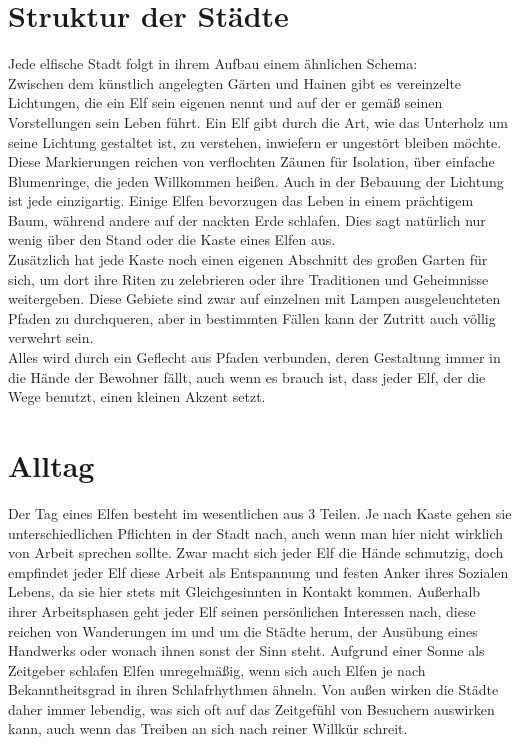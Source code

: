 \documentclass[a4paper,12pt,oneside]{book}
\begin{document}
\chapter{Struktur der Städte}
Jede elfische Stadt folgt in ihrem Aufbau einem ähnlichen Schema: 
\\Zwischen dem künstlich angelegten Gärten und Hainen gibt es vereinzelte Lichtungen, die ein Elf sein eigenen nennt und auf der er gemäß seinen Vorstellungen sein Leben führt. Ein Elf gibt durch die Art, wie das Unterholz um seine Lichtung gestaltet ist, zu verstehen, inwiefern er ungestört bleiben möchte. Diese Markierungen reichen von verflochten Zäunen für Isolation, über einfache Blumenringe, die jeden Willkommen heißen. Auch in der Bebauung der Lichtung ist jede einzigartig. Einige Elfen bevorzugen das Leben in einem prächtigem Baum, während andere auf der nackten Erde schlafen. Dies sagt natürlich nur wenig über den Stand oder die Kaste eines Elfen aus.
\\Zusätzlich hat jede Kaste noch einen eigenen Abschnitt des großen Garten für sich, um dort ihre Riten zu zelebrieren oder ihre Traditionen und Geheimnisse weitergeben. Diese Gebiete sind zwar auf einzelnen mit Lampen ausgeleuchteten Pfaden zu durchqueren, aber in bestimmten Fällen kann der Zutritt auch völlig verwehrt sein.
\\Alles wird durch ein Geflecht aus Pfaden verbunden, deren Gestaltung immer in die Hände der Bewohner fällt, auch wenn es brauch ist, dass jeder Elf, der die Wege benutzt, einen kleinen Akzent setzt.
\chapter{Alltag}
Der Tag eines Elfen besteht im wesentlichen aus 3 Teilen. Je nach Kaste gehen sie unterschiedlichen Pflichten in der Stadt nach, auch wenn man hier nicht wirklich von Arbeit sprechen sollte. Zwar macht sich jeder Elf die Hände schmutzig, doch empfindet jeder Elf diese Arbeit als Entspannung und festen Anker ihres Sozialen Lebens, da sie hier stets mit Gleichgesinnten in Kontakt kommen. Außerhalb ihrer Arbeitsphasen geht jeder Elf seinen persönlichen Interessen nach, diese reichen von Wanderungen im und um die Städte herum, der Ausübung eines Handwerks oder wonach ihnen sonst der Sinn steht. Aufgrund einer Sonne als Zeitgeber schlafen Elfen unregelmäßig, wenn sich auch Elfen je nach Bekanntheitsgrad in ihren Schlafrhythmen ähneln. Von außen wirken die Städte daher immer lebendig, was sich oft auf das Zeitgefühl von Besuchern auswirken kann, auch wenn das Treiben an sich nach reiner Willkür schreit.
\end{document}
